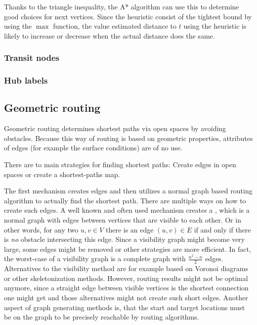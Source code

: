 			Thanks to the triangle inequality, the A* algorithm can use this to determine good choices for next vertices.
			Since the heuristic consist of the tightest bound by using the $\max$ function, the value estimated distance to $t$ using the heuristic is likely to increase or decrease when the actual distance does the same.
		
		\subsubsection{Transit nodes}
		
		\subsubsection{Hub labels}
	
	\subsection{Geometric routing}
	\label{subsec:geometric-routing}
	
		Geometric routing determines shortest paths via open spaces by avoiding obstacles.
		Because this way of routing is based on geometric properties, attributes of edges (for example the surface conditions) are of no use.
		
		
		There are to main strategies for finding shortest paths:
		Create edges in open spaces or create a shortest-paths map.
		
		The first mechanism creates edges and then utilizes a normal graph based routing algorithm to actually find the shortest path.
		There are multiple ways on how to create such edges.
		A well known and often used mechanism creates a , which is a normal graph with edges between vertices that are visible to each other.
		Or in other words, for any two $u, v \in V$ there is an edge $(u, v) \in E$ if and only if there is \textit{no} obstacle intersecting this edge.
		Since a visibility graph might become very large, some edges might be removed or other strategies are more efficient.
		In fact, the worst-case of a visibility graph is a complete graph with $\frac{n^2 - n}{2}$ edges.
		Alternatives to the visibility method are for example based on Voronoi diagrams or other skeletonization methods\cite[219-220]{graser-osm-open-spaces}.
		However, routing results might not be optimal anymore, since a straight edge between visible vertices is the shortest connection one might get and those alternatives might not create such short edges\cite[223]{graser-osm-open-spaces}.
		Another aspect of graph generating methods is, that the start and target locations must be on the graph to be precisely reachable by routing algorithms.
		
